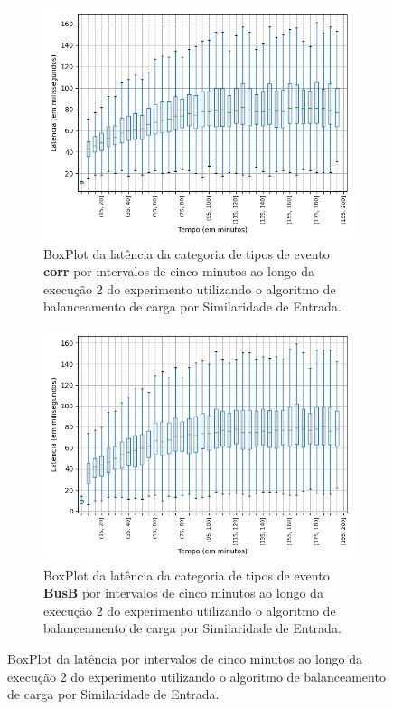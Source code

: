 \begin{figure}
\begin{subfigure}{.5\textwidth}
\centering
\includegraphics[width=\textwidth]{figuras/graphics/boxplot_7-dez-is_corr.png}
\caption{BoxPlot da latência da categoria de tipos de evento \textbf{corr} por intervalos de cinco minutos ao longo da execução 2 do experimento utilizando o algoritmo de balanceamento de carga por Similaridade de Entrada.}
\label{fig:BoxPlot_corr_IS_7-dez-is}
\end{subfigure}%
\begin{subfigure}{.5\textwidth}
\centering
\includegraphics[width=\textwidth]{figuras/graphics/boxplot_7-dez-is_busb.png}
\caption{BoxPlot da latência da categoria de tipos de evento \textbf{BusB} por intervalos de cinco minutos ao longo da execução 2 do experimento utilizando o algoritmo de balanceamento de carga por Similaridade de Entrada.}
\label{fig:BoxPlot_BusB_IS_7-dez-is}
\end{subfigure}%
\caption{BoxPlot da latência por intervalos de cinco minutos ao longo da execução 2 do experimento utilizando o algoritmo de balanceamento de carga por Similaridade de Entrada.}
\end{figure}


